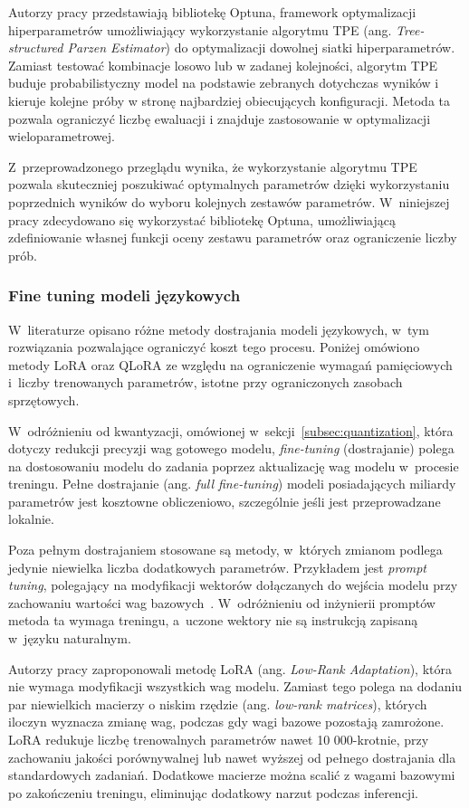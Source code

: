Autorzy pracy \cite{Akiba2019} przedstawiają bibliotekę Optuna, framework optymalizacji hiperparametrów umożliwiający wykorzystanie algorytmu TPE (ang. \textit{Tree-structured Parzen Estimator}) do optymalizacji dowolnej siatki hiperparametrów. Zamiast testować kombinacje losowo lub w zadanej kolejności, algorytm TPE buduje probabilistyczny model na podstawie zebranych dotychczas wyników i kieruje kolejne próby w stronę najbardziej obiecujących konfiguracji. Metoda ta pozwala ograniczyć liczbę ewaluacji i znajduje zastosowanie w optymalizacji wieloparametrowej.

Z~przeprowadzonego przeglądu wynika, że wykorzystanie algorytmu TPE pozwala skuteczniej poszukiwać optymalnych parametrów dzięki wykorzystaniu poprzednich wyników do wyboru kolejnych zestawów parametrów. W~niniejszej pracy zdecydowano się wykorzystać bibliotekę Optuna, umożliwiającą zdefiniowanie własnej funkcji oceny zestawu parametrów oraz ograniczenie liczby prób.

\subsubsection{Fine tuning modeli językowych}\label{sec:finetuning}

W~literaturze opisano różne metody dostrajania modeli językowych, w~tym rozwiązania pozwalające ograniczyć koszt tego procesu. Poniżej omówiono metody LoRA oraz QLoRA ze względu na ograniczenie wymagań pamięciowych i~liczby trenowanych parametrów, istotne przy ograniczonych zasobach sprzętowych.

W~odróżnieniu od kwantyzacji, omówionej w~sekcji~\ref{subsec:quantization}, która dotyczy redukcji precyzji wag gotowego modelu, \textit{fine-tuning} (dostrajanie) polega na dostosowaniu modelu do zadania poprzez aktualizację wag modelu w~procesie treningu. Pełne dostrajanie (ang. \textit{full fine-tuning}) modeli posiadających miliardy parametrów jest kosztowne obliczeniowo, szczególnie jeśli jest przeprowadzane lokalnie.

Poza pełnym dostrajaniem stosowane są metody, w~których zmianom podlega jedynie niewielka liczba dodatkowych parametrów. Przykładem jest \textit{prompt tuning}, polegający na modyfikacji wektorów dołączanych do wejścia modelu przy zachowaniu wartości wag bazowych~\cite{Lester2021PromptTuning}. W~odróżnieniu od inżynierii promptów metoda ta wymaga treningu, a~uczone wektory nie są instrukcją zapisaną w~języku naturalnym.

Autorzy pracy \cite{Hu2022} zaproponowali metodę LoRA (ang. \textit{Low-Rank Adaptation}), która nie wymaga modyfikacji wszystkich wag modelu. Zamiast tego polega na dodaniu par niewielkich macierzy o niskim rzędzie (ang. \textit{low-rank matrices}), których iloczyn wyznacza zmianę wag, podczas gdy wagi bazowe pozostają zamrożone. LoRA redukuje liczbę trenowalnych parametrów nawet 10 000-krotnie, przy zachowaniu jakości porównywalnej lub nawet wyższej od pełnego dostrajania dla standardowych zadaniań. Dodatkowe macierze można scalić z wagami bazowymi po zakończeniu treningu, eliminując dodatkowy narzut podczas inferencji.

